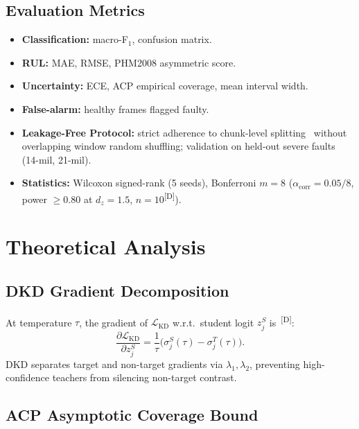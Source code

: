 \documentclass[conference]{IEEEtran}
\newcommand{\evD}{\textsuperscript{\textcolor{derived}{[D]}}\xspace}
\begin{document}
\subsection{Evaluation Metrics}

\begin{itemize}
  \item \textbf{Classification:} macro-F$_1$, confusion matrix.
  \item \textbf{RUL:} MAE, RMSE, PHM2008 asymmetric score.
  \item \textbf{Uncertainty:} ECE, ACP empirical coverage,
    mean interval width.
  \item \textbf{False-alarm:} healthy frames flagged faulty.
  \item \textbf{Leakage-Free Protocol:} strict adherence to chunk-level splitting~\cite{vieira2026realistic,leakage2026bearing}
    without overlapping window random shuffling; validation on held-out severe faults (14-mil, 21-mil).
  \item \textbf{Statistics:} Wilcoxon signed-rank (5 seeds),
    Bonferroni $m=8$
    ($\alpha_\text{corr}=0.05/8$,
    power $\ge 0.80$ at $d_z=1.5$, $n=10$\evD).
\end{itemize}

\section{Theoretical Analysis}
\label{sec:theory}

\subsection{DKD Gradient Decomposition}

At temperature $\tau$, the gradient of $\mathcal{L}_\mathrm{KD}$
w.r.t.\ student logit $z_j^S$ is~\cite{zhao2022decoupled}\evD:
\begin{equation}
  \frac{\partial\mathcal{L}_\mathrm{KD}}{\partial z_j^S}
    = \frac{1}{\tau}
      \bigl(\sigma_j^S(\tau)-\sigma_j^T(\tau)\bigr).
\end{equation}
DKD separates target and non-target gradients via $\lambda_1,\lambda_2$,
preventing high-confidence teachers from silencing non-target contrast.

\subsection{ACP Asymptotic Coverage Bound}
\end{document}
